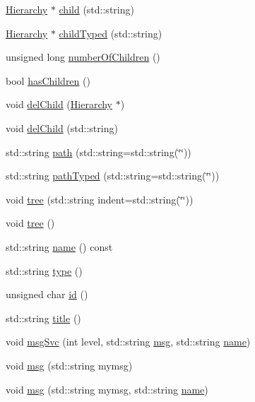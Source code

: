 \begin{DoxyCompactItemize}
\hyperlink{classHierarchy}{Hierarchy} $\ast$ \hyperlink{classHierarchy_a1e207f973c694b538bf90107b4868817}{child} (std\+::string)
\item 
\hyperlink{classHierarchy}{Hierarchy} $\ast$ \hyperlink{classHierarchy_a0c15a5276a3b80b4354d6bd8a01e0708}{child\+Typed} (std\+::string)
\item 
unsigned long \hyperlink{classHierarchy_ab16e84de65fd84e14001a6cf941c8be4}{number\+Of\+Children} ()
\item 
bool \hyperlink{classHierarchy_a255174fe4d316d2a3f430dcb9dab29f1}{has\+Children} ()
\item 
void \hyperlink{classHierarchy_a2b2b359fac003233f65786a616766bde}{del\+Child} (\hyperlink{classHierarchy}{Hierarchy} $\ast$)
\item 
void \hyperlink{classHierarchy_a1928ac7615fe0b5e55cd707f70dc6781}{del\+Child} (std\+::string)
\item 
std\+::string \hyperlink{classHierarchy_aa7990fa7caf132d83e361ce033c6c65a}{path} (std\+::string=std\+::string(\char`\"{}\char`\"{}))
\item 
std\+::string \hyperlink{classHierarchy_a1efd56cd164d328d2002e53a10a19b8c}{path\+Typed} (std\+::string=std\+::string(\char`\"{}\char`\"{}))
\item 
void \hyperlink{classHierarchy_a76e914b9a677a22a82deb74d892bf261}{tree} (std\+::string indent=std\+::string(\char`\"{}\char`\"{}))
\item 
void \hyperlink{classHierarchy_a594c294c5f60c230e106d522ed008212}{tree} ()
\item 
std\+::string \hyperlink{classObject_a300f4c05dd468c7bb8b3c968868443c1}{name} () const
\item 
std\+::string \hyperlink{classObject_a84f99f70f144a83e1582d1d0f84e4e62}{type} ()
\item 
unsigned char \hyperlink{classObject_af99145335cc61ff6e2798ea17db009d2}{id} ()
\item 
std\+::string \hyperlink{classObject_a73a0f1a41828fdd8303dd662446fb6c3}{title} ()
\item 
void \hyperlink{classObject_a3f9d5537ebce0c0f2bf6ae4d92426f3c}{msg\+Svc} (int level, std\+::string \hyperlink{classObject_a58b2d0618c2d08cf2383012611528d97}{msg}, std\+::string \hyperlink{classObject_a300f4c05dd468c7bb8b3c968868443c1}{name})
\item 
void \hyperlink{classObject_a58b2d0618c2d08cf2383012611528d97}{msg} (std\+::string mymsg)
\item 
void \hyperlink{classObject_ac5d59299273cee27aacf7de00d2e7034}{msg} (std\+::string mymsg, std\+::string \hyperlink{classObject_a300f4c05dd468c7bb8b3c968868443c1}{name})

\end{DoxyCompactItemize}
